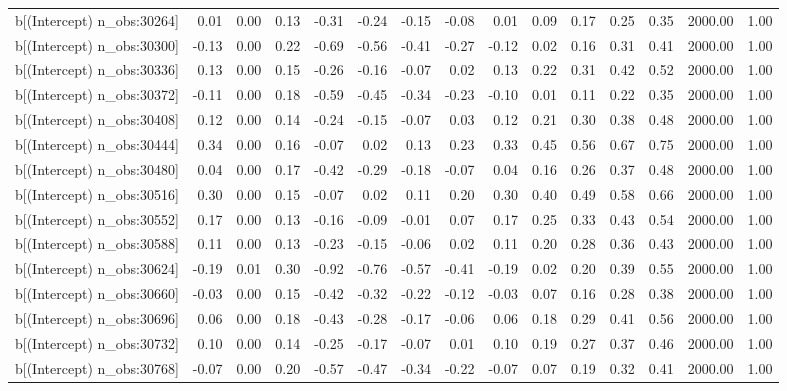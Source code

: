\begin{table}[ht]
\begin{tabular}{rrrrrrrrrrrrrrr}
  b[(Intercept) n\_obs:30264] & 0.01 & 0.00 & 0.13 & -0.31 & -0.24 & -0.15 & -0.08 & 0.01 & 0.09 & 0.17 & 0.25 & 0.35 & 2000.00 & 1.00 \\ 
  b[(Intercept) n\_obs:30300] & -0.13 & 0.00 & 0.22 & -0.69 & -0.56 & -0.41 & -0.27 & -0.12 & 0.02 & 0.16 & 0.31 & 0.41 & 2000.00 & 1.00 \\ 
  b[(Intercept) n\_obs:30336] & 0.13 & 0.00 & 0.15 & -0.26 & -0.16 & -0.07 & 0.02 & 0.13 & 0.22 & 0.31 & 0.42 & 0.52 & 2000.00 & 1.00 \\ 
  b[(Intercept) n\_obs:30372] & -0.11 & 0.00 & 0.18 & -0.59 & -0.45 & -0.34 & -0.23 & -0.10 & 0.01 & 0.11 & 0.22 & 0.35 & 2000.00 & 1.00 \\ 
  b[(Intercept) n\_obs:30408] & 0.12 & 0.00 & 0.14 & -0.24 & -0.15 & -0.07 & 0.03 & 0.12 & 0.21 & 0.30 & 0.38 & 0.48 & 2000.00 & 1.00 \\ 
  b[(Intercept) n\_obs:30444] & 0.34 & 0.00 & 0.16 & -0.07 & 0.02 & 0.13 & 0.23 & 0.33 & 0.45 & 0.56 & 0.67 & 0.75 & 2000.00 & 1.00 \\ 
  b[(Intercept) n\_obs:30480] & 0.04 & 0.00 & 0.17 & -0.42 & -0.29 & -0.18 & -0.07 & 0.04 & 0.16 & 0.26 & 0.37 & 0.48 & 2000.00 & 1.00 \\ 
  b[(Intercept) n\_obs:30516] & 0.30 & 0.00 & 0.15 & -0.07 & 0.02 & 0.11 & 0.20 & 0.30 & 0.40 & 0.49 & 0.58 & 0.66 & 2000.00 & 1.00 \\ 
  b[(Intercept) n\_obs:30552] & 0.17 & 0.00 & 0.13 & -0.16 & -0.09 & -0.01 & 0.07 & 0.17 & 0.25 & 0.33 & 0.43 & 0.54 & 2000.00 & 1.00 \\ 
  b[(Intercept) n\_obs:30588] & 0.11 & 0.00 & 0.13 & -0.23 & -0.15 & -0.06 & 0.02 & 0.11 & 0.20 & 0.28 & 0.36 & 0.43 & 2000.00 & 1.00 \\ 
  b[(Intercept) n\_obs:30624] & -0.19 & 0.01 & 0.30 & -0.92 & -0.76 & -0.57 & -0.41 & -0.19 & 0.02 & 0.20 & 0.39 & 0.55 & 2000.00 & 1.00 \\ 
  b[(Intercept) n\_obs:30660] & -0.03 & 0.00 & 0.15 & -0.42 & -0.32 & -0.22 & -0.12 & -0.03 & 0.07 & 0.16 & 0.28 & 0.38 & 2000.00 & 1.00 \\ 
  b[(Intercept) n\_obs:30696] & 0.06 & 0.00 & 0.18 & -0.43 & -0.28 & -0.17 & -0.06 & 0.06 & 0.18 & 0.29 & 0.41 & 0.56 & 2000.00 & 1.00 \\ 
  b[(Intercept) n\_obs:30732] & 0.10 & 0.00 & 0.14 & -0.25 & -0.17 & -0.07 & 0.01 & 0.10 & 0.19 & 0.27 & 0.37 & 0.46 & 2000.00 & 1.00 \\ 
  b[(Intercept) n\_obs:30768] & -0.07 & 0.00 & 0.20 & -0.57 & -0.47 & -0.34 & -0.22 & -0.07 & 0.07 & 0.19 & 0.32 & 0.41 & 2000.00 & 1.00 \\ 

\end{tabular}
\end{table}
